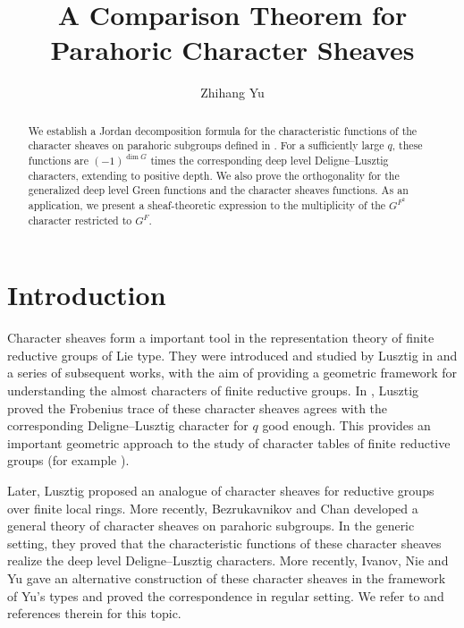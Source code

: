 \documentclass[11pt,letterpaper]{amsart}
\theoremstyle{definition}
\numberwithin{equation}{section}
\numberwithin{theorem}{section}
\begin{document}
\title[A Comparison Theorem for Parahoric Character Sheaves]
{A Comparison Theorem for Parahoric Character Sheaves}
\date{}
\begin{abstract}
We establish a Jordan decomposition formula for the characteristic
functions of the character sheaves on parahoric subgroups defined in \cite{INY25}.  For a
sufficiently large $q$, these functions are $(-1)^{\dim G}$
times the corresponding deep level Deligne--Lusztig characters, extending
\cite{Lu90} to positive depth.  We also prove the orthogonality for the
generalized deep level Green functions and the character sheaves functions. As an application,
we present a sheaf-theoretic expression to the multiplicity of the
$G^{F^2}$ character restricted to
$G^{F}$.
\end{abstract}

\author{Zhihang Yu}

\maketitle
\section{Introduction}
Character sheaves form a  important tool in the representation theory of finite reductive groups of Lie type. They were introduced and studied by Lusztig in \cite{Lusztig_85I} and a series of subsequent works, with the aim of providing a geometric framework for understanding the almost characters of finite reductive groups. In \cite{Lu90}, Lusztig proved the Frobenius trace of these character sheaves agrees with the corresponding Deligne–Lusztig character for $q$ good enough. This provides an important geometric approach to the study of character tables of finite reductive groups (for example \cite{shoji95}).

Later, Lusztig \cite{Lusztig_17} proposed an analogue of character sheaves for reductive groups over finite local rings. More recently, Bezrukavnikov and Chan \cite{BC24} developed a general theory of character sheaves on parahoric subgroups. In the generic setting, they proved that the characteristic functions of these character sheaves realize the deep level Deligne--Lusztig characters. More recently, Ivanov, Nie and Yu \cite{INY25} gave an alternative construction of these character sheaves in the framework of Yu's types and proved the correspondence in regular setting. We refer to \cite{Lusztig_04,CI_MPDL, ChenS_17, ChanO_21, CS23, Chan_siDL, Chan24, IvanovNie_24,IvanovNie_25, CO25, Yu26,IN26} and references therein for this topic.
\end{document}
